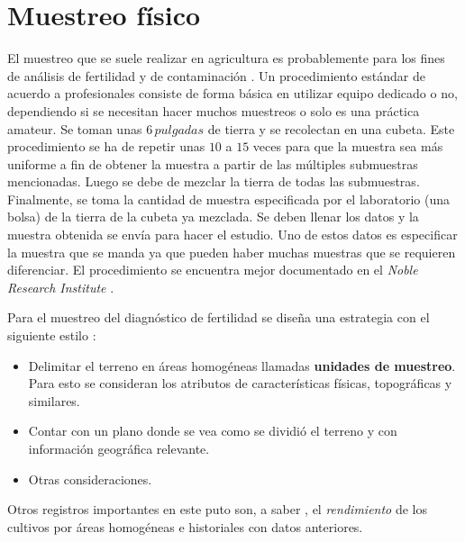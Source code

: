 \documentclass{report}
\begin{document}
\section{Muestreo físico}

El muestreo que se suele realizar en agricultura es probablemente para los fines de análisis de fertilidad \cite{lassaga-2011} y de contaminación \cite{gobpe-ministerio-del-ambiente-2014}. Un procedimiento estándar de acuerdo a profesionales consiste de forma básica en utilizar equipo dedicado \cite{ministry-of-agriculture-food-and-fisheries-2020} o no, dependiendo si se necesitan hacer muchos muestreos o solo es una práctica amateur. Se toman unas $6 \, pulgadas$ de tierra y se recolectan en una cubeta. Este procedimiento se ha de repetir unas $10$ a $15$ veces para que la muestra sea más uniforme a fin de obtener la muestra a partir de las múltiples submuestras mencionadas. Luego se debe de mezclar la tierra de todas las submuestras. Finalmente, se toma la cantidad de muestra especificada por el laboratorio (una bolsa) de la tierra de la cubeta ya mezclada. Se deben llenar los datos y la muestra obtenida se envía para hacer el estudio. Uno de estos datos es especificar la muestra que se manda ya que pueden haber muchas muestras que se requieren diferenciar. El procedimiento se encuentra mejor documentado en el \textit{Noble Research Institute} \cite{funderburg-2014}.

\bigbreak

Para el muestreo del diagnóstico de fertilidad se diseña una estrategia con el siguiente estilo \cite{lassaga-2011}:

\begin{itemize}
    \item Delimitar el terreno en áreas homogéneas llamadas \textbf{unidades de muestreo}. Para esto se consideran los atributos de características físicas, topográficas y similares.
    
    \item Contar con un plano donde se vea como se dividió el terreno y con información geográfica relevante.
    
    \item Otras consideraciones.
\end{itemize}

Otros registros importantes en este puto son, a saber \cite{lassaga-2011}, el \textit{rendimiento} de los cultivos por áreas homogéneas e historiales con datos anteriores.

\bigbreak
\end{document}
